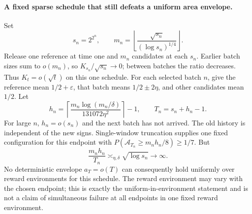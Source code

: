 \paragraph{A fixed sparse schedule that still defeats a uniform area envelope.}
Set
\[
 s_n=2^{2^n},\qquad
 m_n=\left\lfloor\frac{\sqrt{s_n}}{(\log s_n)^{1/4}}\right\rfloor.
\]
Release one reference at time one and $m_n$ candidates at each $s_n$.
Earlier batch sizes sum to $o(m_n)$, so $K_{s_n}/\sqrt{s_n}\to0$; between
batches the ratio decreases. Thus $K_t=o(\sqrt t)$ on this one schedule.
For each selected batch $n$, give the reference mean $1/2+\varepsilon$,
that batch means $1/2\pm2\eta$, and other candidates mean $1/2$. Let
\[
 h_n=\left\lceil\frac{m_n\log(m_n/\delta)}{131072\eta^2}\right\rceil-1,
 \qquad T_n=s_n+h_n-1.
\]
For large $n$, $h_n=o(s_n)$ and the next batch has not arrived. The old
history is independent of the new signs. Single-window truncation supplies
one fixed configuration for this endpoint with
$P(\mathcal A_{T_n}\ge m_nh_n/8)\ge1/7$. But
\[
 \frac{m_nh_n}{T_n}\asymp_{\eta,\delta}\sqrt{\log s_n}\longrightarrow\infty.
\]
No deterministic envelope $a_T=o(T)$ can consequently hold uniformly over
reward environments for this schedule. The reward environment may vary
with the chosen endpoint; this is exactly the uniform-in-environment
statement and is not a claim of simultaneous failure at all endpoints in
one fixed reward environment.
